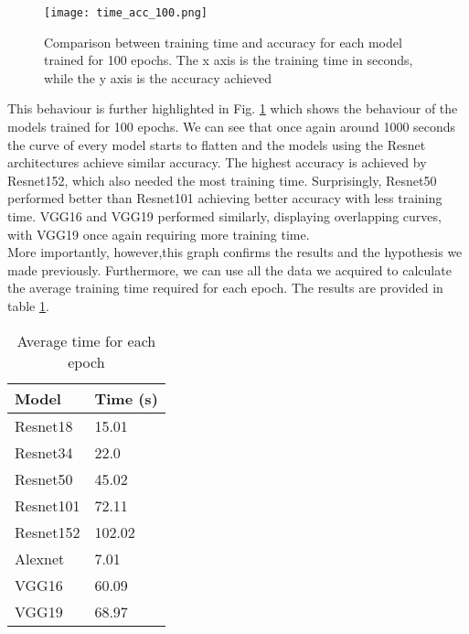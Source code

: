 \begin{figure}[h]
       \centering 
	    \texttt{[image: time\_acc\_100.png]}
        \caption[Comparison between training time and accuracy for each model for 100 epochs]{Comparison between training time and accuracy for each model trained for 100 epochs. The x axis is the training time in seconds, while the y axis is the accuracy achieved}
         \label{fig:time_acc_100}
\end{figure}




This behaviour is further highlighted in Fig. \ref{fig:time_acc_100} which shows the behaviour of the models trained for 100 epochs. We can see that once again around 1000 seconds the curve of every model starts to flatten and the models using the Resnet architectures achieve similar accuracy. The highest accuracy is achieved by Resnet152, which also needed the most training time. Surprisingly, Resnet50 performed better than Resnet101 achieving better accuracy with less training time.
VGG16 and VGG19 performed similarly, displaying overlapping curves, with VGG19 once again requiring more training time. \\
More importantly, however,this graph confirms the results and the hypothesis we made previously. Furthermore, we can use all the data we acquired to calculate the average training time required for each epoch. The results are provided in table \ref{tab:time_f_epoch}.
\begin{table}[h]
\centering
\begin{tabular}{ p{2cm} p{2cm}   }
 Model&Time (s)\\
 \hline
Resnet18&15.01\\
Resnet34&22.0\\
Resnet50&45.02\\
Resnet101&72.11\\
Resnet152&102.02\\
Alexnet&7.01\\
VGG16&60.09\\
VGG19&68.97\\
 \hline
\end{tabular}
\caption{Average time for each epoch}
\label{tab:time_f_epoch}
\end{table}

